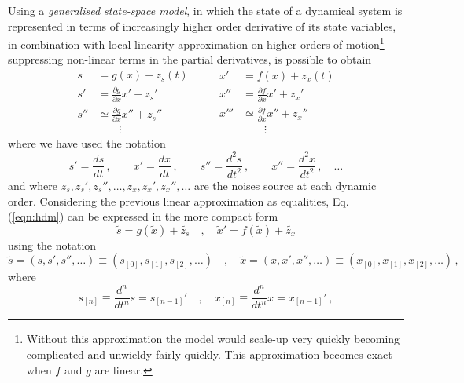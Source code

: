 \documentclass[a4paper, 10pt]{article}
\begin{document}
Using a \emph{generalised state-space model}, in which the state of a dynamical system is represented in terms of increasingly higher order derivative of its state variables, in combination with local linearity approximation on higher orders of motion\footnote{Without this approximation the model would scale-up very quickly becoming complicated and unwieldy fairly quickly. This approximation becomes exact when $f$ and $g$ are linear.} suppressing non-linear terms in the partial derivatives, is possible to obtain 
\begin{equation}
  \begin{split}
    s &= g(x) + z_{s}(t) \\
    s' &= \frac{\partial g}{\partial x}x' + z_{s}' \\
    s'' & \simeq \frac{\partial g}{\partial x}x'' + z_{s}''\\
    				& \qquad \vdots
  \end{split}
  \qquad
  \begin{split}
    x' &= f(x) + z_{x}(t) \\
    x'' &= \frac{\partial f}{\partial x}x' + z_{x}' \\
    x''' & \simeq \frac{\partial f}{\partial x}x'' + z_{x}''\\
    				& \qquad \vdots
  \end{split}
\label{eqn:hdm}
\end{equation}
where we have used the notation
\begin{equation}
s' = \frac{ds}{dt} \, , \qquad x'=\frac{dx}{dt} \, , \qquad s''= \frac{d^2 s}{dt^2} \, , \qquad x''= \frac{d^2 x}{dt^2} \, , \quad \dots
\end{equation}
and where $z_{s},z_{s}',z_{s}'',\dots, z_{x},z_{x}',z_{x}'',\dots$ are the noises source at each dynamic order.
Considering the previous linear approximation as equalities, Eq.(\ref{eqn:hdm}) can be expressed in the more compact form
\begin{equation}
\tilde{s} = g(\tilde{x}) + \tilde{z_{s}} \quad , \quad \tilde{x}' = f(\tilde{x}) + \tilde{z_{x}}
\end{equation}
using the notation 
\begin{equation}
\tilde{s} = (s, s', s'', \dots) \equiv (s_{[0]}, s_{[1]}, s_{[2]}, \dots)  \quad , \quad \tilde{x} = (x, x ', x '', \dots) \equiv (x_{[0]}, x_{[1]}, x_{[2]}, \dots)\, ,
\end{equation}
where
\begin{equation}
s_{[n]} \equiv \frac{d^n}{dt^n}s = s_{[n-1]}' \quad , \quad x_{[n]} \equiv \frac{d^n}{dt^n}x = x_{[n-1]}' \, ,
\end{equation}
\end{document}
